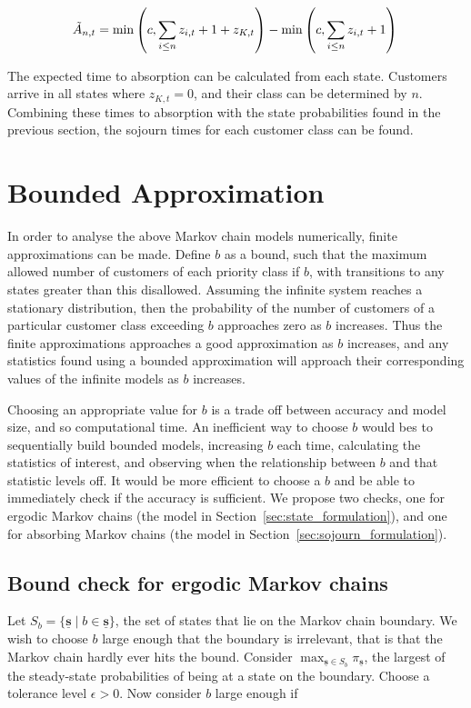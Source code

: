 \documentclass{article}
\begin{document}
\begin{equation}\label{eqn:inservice_adapt_tilde}
\tilde{A}_{n,t} =
\min\left(c, \sum_{i \leq n} z_{i,t} + 1 + z_{K,t}\right) - \min\left(c, \sum_{i \leq n} z_{i,t} + 1\right) \\
\end{equation}


The expected time to absorption can be calculated from each state.
Customers arrive in all states where $z_{K,t} = 0$, and their class can be
determined by $n$. Combining these times to absorption with the state
probabilities found in the previous section, the sojourn times for each customer
class can be found.




\section{Bounded Approximation}\label{sec:bound}
In order to analyse the above Markov chain models numerically, finite
approximations can be made. Define $b$ as a bound, such that the maximum allowed
number of customers of each priority class if $b$, with transitions to any
states greater than this disallowed.
Assuming the infinite system reaches a stationary distribution, then the
probability of the number of customers of a particular customer class exceeding
$b$ approaches zero as $b$ increases. Thus the finite approximations approaches
a good approximation as $b$ increases, and any statistics found using a bounded
approximation will approach their corresponding values of the infinite models as
$b$ increases.

Choosing an appropriate value for $b$ is a trade off between accuracy and model
size, and so computational time. An inefficient way to choose $b$ would bes to
sequentially build bounded models, increasing $b$ each time, calculating the
statistics of interest, and observing when the relationship between $b$ and that
statistic levels off.
It would be more efficient to choose a $b$ and be able to immediately check if
the accuracy is sufficient. We propose two checks, one for ergodic Markov
chains (the model in Section~\ref{sec:state_formulation}), and one for absorbing
Markov chains (the model in Section~\ref{sec:sojourn_formulation}).




\subsection{Bound check for ergodic Markov chains}\label{sec:ergodic_check}
Let $S_b = \{\underline{\mathbf{s}} \;|\; b \in \underline{\mathbf{s}}\}$, the
set of states that lie on the Markov chain boundary. We wish to choose $b$ large
enough that the boundary is irrelevant, that is that the Markov chain hardly
ever hits the bound. Consider
$\max_{\underline{\mathbf{s}} \in S_b} \pi_{\underline{\mathbf{s}}}$, the
largest of the steady-state probabilities of being at a state on the boundary.
Choose a tolerance level $\epsilon > 0$. Now consider $b$ large enough if
\end{document}
